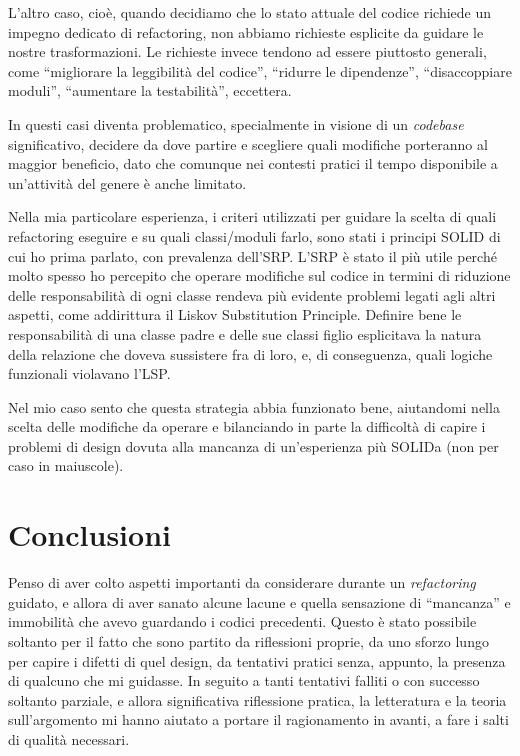 \documentclass[12pt]{report}
\begin{document}
L'altro caso, cioè, quando decidiamo che lo stato attuale del codice
richiede un impegno dedicato di refactoring, non abbiamo richieste esplicite
da guidare le nostre trasformazioni. Le richieste invece tendono ad essere
piuttosto generali, come ``migliorare la leggibilità del codice'', ``ridurre
le dipendenze'', ``disaccoppiare moduli'', ``aumentare la testabilità'',
eccettera.

In questi casi diventa problematico, specialmente in visione di un
\textit{codebase} significativo, decidere da dove partire e scegliere
quali modifiche porteranno al maggior beneficio, dato che comunque
nei contesti pratici il tempo disponibile a un'attività del genere è 
anche limitato.

Nella mia particolare esperienza, i criteri utilizzati per guidare la scelta
di quali refactoring eseguire e su quali classi/moduli farlo, sono stati i
principi SOLID di cui ho prima parlato, con prevalenza dell'SRP. L'SRP è
stato il più utile perché molto spesso ho percepito che operare modifiche
sul codice in termini di riduzione delle responsabilità di ogni classe
rendeva più evidente problemi legati agli altri aspetti, come addirittura
il Liskov Substitution Principle. Definire bene le responsabilità di una classe
padre e delle sue classi figlio esplicitava la natura della relazione che
doveva sussistere fra di loro, e, di conseguenza, quali logiche funzionali
violavano l'LSP. 

Nel mio caso sento che questa strategia abbia funzionato bene, aiutandomi
nella scelta delle modifiche da operare e bilanciando in parte la
difficoltà di capire i problemi di design dovuta alla mancanza di un'esperienza
più SOLIDa (non per caso in maiuscole).

\chapter{Conclusioni}


Penso di aver colto aspetti importanti da considerare durante un 
\textit{refactoring} guidato, e allora di aver sanato alcune lacune e 
quella sensazione di ``mancanza'' e immobilità che avevo guardando i codici 
precedenti. Questo è stato possibile soltanto per il fatto che sono 
partito da riflessioni proprie, da uno sforzo lungo per capire i 
difetti di quel design, da tentativi pratici senza, appunto, 
la presenza di qualcuno che mi guidasse. In seguito a tanti tentativi
falliti o con successo soltanto parziale, e allora significativa riflessione
pratica, la letteratura e la teoria sull'argomento mi hanno aiutato a 
portare il ragionamento in avanti, a fare i salti di qualità
necessari.
\end{document}
